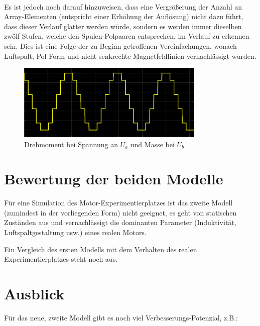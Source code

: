 \paragraph{}
Es ist jedoch noch darauf hinzuweisen, dass eine Vergrößerung der Anzahl an Array-Elementen (entspricht einer Erhöhung der Auflösung) nicht dazu führt, dass dieser Verlauf glatter werden würde, sondern es werden immer dieselben zwölf Stufen, welche den Spulen-Polpaaren entsprechen, im Verlauf zu erkennen sein.
Dies ist eine Folge der zu Beginn getroffenen Vereinfachungen, wonach Luftspalt, Pol Form und nicht-senkrechte Magnetfeldlinien vernachlässigt wurden.

\begin{figure}[htbp]
	\centering
	\includegraphics[width=0.8\textwidth]{./sim/pictures/drehmoment.png}
	\caption{Drehmoment bei Spannung an $U_a$ und Masse bei $U_b$}
	\label{FigDrehmoment}
\end{figure}

\section{Bewertung der beiden Modelle}
Für eine Simulation des Motor-Experimentierplatzes ist das zweite Modell (zumindest in der vorliegenden Form) nicht geeignet, es geht von statischen Zuständen aus und vernachlässigt die dominanten Parameter (Induktivität, Luftspaltgestaltung usw.) eines realen Motors.

Ein Vergleich des ersten Modells mit dem Verhalten des realen Experimentierplatzes steht noch aus.

\section{Ausblick}
Für das neue, zweite Modell gibt es noch viel Verbesserungs-Potenzial, z.B.:

